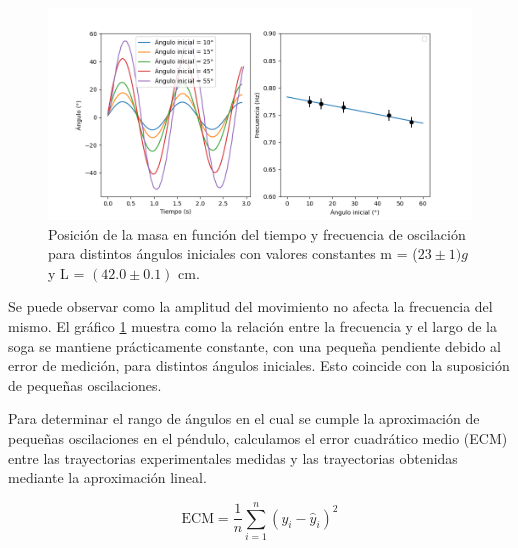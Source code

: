 \documentclass[12pt,a4]{article}
\begin{document}
\begin{figure}[H]
    \centering
    \includegraphics[width=0.6\linewidth]{angulos.png}
    \caption{Posición de la masa en función del tiempo y frecuencia de oscilación para distintos ángulos iniciales con valores constantes m = ($23 \pm 1) g$ y L = $(42.0\pm0.1)$ cm.}
    \label{fig:angulos}
\end{figure}

Se puede observar como la amplitud del movimiento no afecta la frecuencia del mismo. El gráfico \ref{fig:angulos} muestra como la relación entre la frecuencia y el largo de la soga se mantiene prácticamente constante, con una pequeña pendiente debido al error de medición, para distintos ángulos iniciales. Esto coincide con la suposición de pequeñas oscilaciones.

Para determinar el rango de ángulos en el cual se cumple la aproximación de pequeñas oscilaciones en el péndulo, calculamos el error cuadrático medio (ECM) entre las trayectorias experimentales medidas y las trayectorias obtenidas mediante la aproximación lineal. 

\[
\text{ECM} = \frac{1}{n} \sum_{i=1}^{n} (y_i - \hat{y}_i)^2
\]
\end{document}
